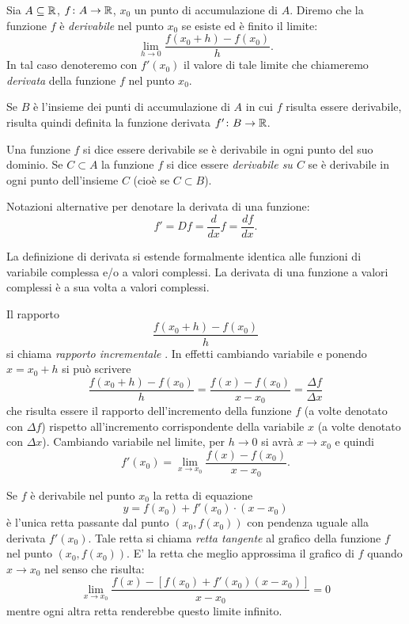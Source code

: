 \begin{definition}[derivata]
\mymark{***}%
Sia $A\subseteq {\mathbb R}$, $f\colon A \to {\mathbb R}$, $x_0$ un punto di accumulazione di $A$.
Diremo che la funzione $f$ è \emph{derivabile} nel punto $x_0$ se esiste
ed è finito il limite:
\[
  \lim_{h\to 0} \frac{f(x_0+h) - f(x_0)}{h}.
\]
In tal caso denoteremo con $f'(x_0)$ il valore di tale limite che chiameremo
\emph{derivata}%
%
 della funzione $f$ nel punto $x_0$.

Se $B$ è l'insieme dei punti di accumulazione di $A$ in cui $f$ risulta essere derivabile, risulta quindi definita la funzione derivata $f'\colon B \to {\mathbb R}$.

Una funzione $f$ si dice essere derivabile se è derivabile in ogni punto del suo dominio.
Se $C\subset A$ la funzione $f$ si dice essere \emph{derivabile su $C$} se è derivabile in ogni punto dell'insieme $C$ (cioè se $C\subset B$).

Notazioni alternative per denotare la derivata di una funzione:
\[
  f' = Df = \frac{d}{dx} f = \frac{df}{dx}.
\]

La definizione di derivata si estende formalmente identica 
alle funzioni di variabile complessa e/o a valori complessi.
La derivata di una funzione a valori complessi è
a sua volta a valori complessi.
\end{definition}

Il rapporto
\[
\frac{f(x_0+h) - f(x_0)}{h}
\]
si chiama \emph{rapporto incrementale}%
%
. In effetti cambiando variabile e ponendo $x=x_0+h$ si può scrivere
\[
\frac{f(x_0+h) - f(x_0)}{h}
= \frac{f(x) - f(x_0)}{x-x_0}
= \frac{\Delta f}{\Delta x}
\]
che risulta essere il rapporto dell'incremento della funzione $f$ (a volte denotato con $\Delta f$) rispetto all'incremento corrispondente della variabile $x$ (a volte denotato con $\Delta x$).
Cambiando variabile nel limite, per $h\to 0$ si avrà $x\to x_0$
e quindi
\[
 f'(x_0) = \lim_{x\to x_0} \frac{f(x)-f(x_0)}{x-x_0}.
\]

Se $f$ è derivabile nel punto $x_0$
la retta di equazione 
%
\begin{equation}\label{eq:retta_tangente}
  y = f(x_0) + f'(x_0) \cdot (x-x_0)  
\end{equation}
è l'unica retta passante dal punto $(x_0,f(x_0))$ 
con pendenza uguale alla derivata $f'(x_0)$.
Tale retta si chiama \emph{retta tangente}
%
%
al grafico della funzione $f$ nel punto $(x_0,f(x_0))$.
E' la retta che meglio approssima il grafico di $f$ 
quando $x\to x_0$ nel senso che risulta:
\[
  \lim_{x\to x_0} \frac{f(x) - [f(x_0)+f'(x_0)(x-x_0)]}{x-x_0} = 0
\]
mentre ogni altra retta renderebbe questo limite infinito.

